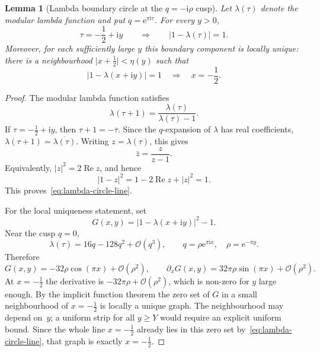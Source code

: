 \documentclass[11pt,a4paper]{article}
\theoremstyle{plain}
\newtheorem{lemma}[theorem]{Lemma}
\theoremstyle{definition}
\theoremstyle{remark}
\DeclareMathOperator{\Real}{Re}
\newcommand{\ee}{\mathrm{e}}
\newcommand{\ii}{\mathrm{i}}
\newcommand{\abs}[1]{\lvert #1 \rvert}
\newcommand{\Oo}{\mathcal{O}}
\begin{document}
\begin{lemma}[Lambda boundary circle at the $q=-\ii\rho$ cusp]
\label{lem:lambda-boundary-circle}
Let $\lambda(\tau)$ denote the modular lambda function and put
$q=\ee^{\pi\ii\tau}$.  For every $y>0$,
\begin{equation}\label{eq:lambda-circle-line}
  \tau=-\frac12+\ii y
  \qquad\Longrightarrow\qquad
  \abs{1-\lambda(\tau)}=1 .
\end{equation}
Moreover, for each sufficiently large $y$ this boundary component is
locally unique: there is a neighbourhood
$\abs{x+\tfrac12}<\eta(y)$ such that
\begin{equation}\label{eq:lambda-circle-local-unique}
  \abs{1-\lambda(x+\ii y)}=1
  \quad\Longrightarrow\quad
  x=-\frac12 .
\end{equation}
\end{lemma}

\begin{proof}
The modular lambda function satisfies
\begin{equation}\label{eq:lambda-T-transform}
  \lambda(\tau+1)=\frac{\lambda(\tau)}{\lambda(\tau)-1}.
\end{equation}
If $\tau=-\tfrac12+\ii y$, then $\tau+1=-\overline{\tau}$.
Since the $q$-expansion of $\lambda$ has real coefficients,
$\lambda(\tau+1)=\overline{\lambda(\tau)}$.  Writing
$z=\lambda(\tau)$, this gives
\[
  \bar z=\frac{z}{z-1}.
\]
Equivalently, $\abs{z}^2=2\Real z$, and hence
\[
  \abs{1-z}^2=1-2\Real z+\abs{z}^2=1.
\]
This proves~\eqref{eq:lambda-circle-line}.

For the local uniqueness statement, set
\[
  G(x,y)=\abs{1-\lambda(x+\ii y)}^2-1 .
\]
Near the cusp $q=0$,
\[
  \lambda(\tau)=16q-128q^2+\Oo(q^3),
  \qquad q=\rho\ee^{\pi\ii x},\quad \rho=\ee^{-\pi y}.
\]
Therefore
\[
  G(x,y)
  =-32\rho\cos(\pi x)+\Oo(\rho^2),
  \qquad
  \partial_xG(x,y)
  =32\pi\rho\sin(\pi x)+\Oo(\rho^2).
\]
At $x=-\tfrac12$ the derivative is
$-32\pi\rho+\Oo(\rho^2)$, which is non-zero for $y$ large enough.
By the implicit function theorem the zero set of $G$ in a small
neighbourhood of $x=-\tfrac12$ is locally a unique graph.  The
neighbourhood may depend on~$y$; a uniform strip for all $y\ge Y$
would require an explicit uniform bound.  Since the whole line
$x=-\tfrac12$ already lies in this zero set by~\eqref{eq:lambda-circle-line},
that graph is exactly $x=-\tfrac12$.
\end{proof}
\end{document}
